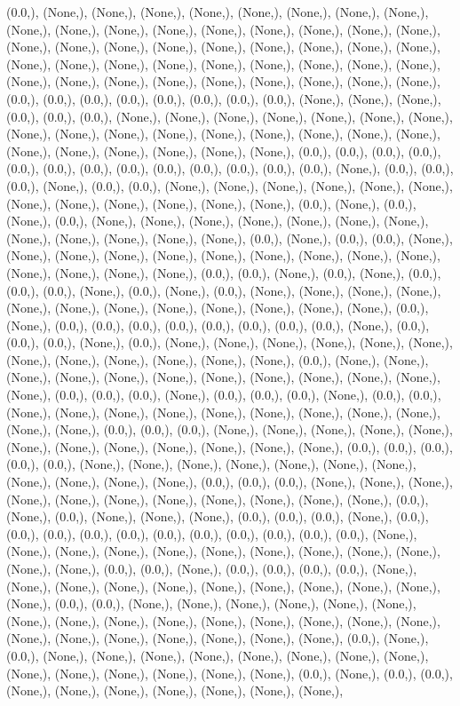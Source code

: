 \documentclass{article}
\begin{document}
(0.0,), (None,), (None,), (None,), (None,), (None,), (None,), (None,), (None,), (None,), (None,), (None,), (None,), (None,), (None,), (None,), (None,), (None,), (None,), (None,), (None,), (None,), (None,), (None,), (None,), (None,), (None,), (None,), (None,), (None,), (None,), (None,), (None,), (None,), (None,), (None,), (None,), (None,), (None,), (None,), (None,), (None,), (None,), (None,), (None,), (0.0,), (0.0,), (0.0,), (0.0,), (0.0,), (0.0,), (0.0,), (0.0,), (None,), (None,), (None,), (0.0,), (0.0,), (0.0,), (None,), (None,), (None,), (None,), (None,), (None,), (None,), (None,), (None,), (None,), (None,), (None,), (None,), (None,), (None,), (None,), (None,), (None,), (None,), (None,), (None,), (None,), (0.0,), (0.0,), (0.0,), (0.0,), (0.0,), (0.0,), (0.0,), (0.0,), (0.0,), (0.0,), (0.0,), (0.0,), (0.0,), (None,), (0.0,), (0.0,), (0.0,), (None,), (0.0,), (0.0,), (None,), (None,), (None,), (None,), (None,), (None,), (None,), (None,), (None,), (None,), (None,), (None,), (0.0,), (None,), (0.0,), (None,), (0.0,), (None,), (None,), (None,), (None,), (None,), (None,), (None,), (None,), (None,), (None,), (None,), (None,), (0.0,), (None,), (0.0,), (0.0,), (None,), (None,), (None,), (None,), (None,), (None,), (None,), (None,), (None,), (None,), (None,), (None,), (None,), (None,), (0.0,), (0.0,), (None,), (0.0,), (None,), (0.0,), (0.0,), (0.0,), (None,), (0.0,), (None,), (0.0,), (None,), (None,), (None,), (None,), (None,), (None,), (None,), (None,), (None,), (None,), (None,), (None,), (0.0,), (None,), (0.0,), (0.0,), (0.0,), (0.0,), (0.0,), (0.0,), (0.0,), (0.0,), (None,), (0.0,), (0.0,), (0.0,), (None,), (0.0,), (None,), (None,), (None,), (None,), (None,), (None,), (None,), (None,), (None,), (None,), (None,), (None,), (0.0,), (None,), (None,), (None,), (None,), (None,), (None,), (None,), (None,), (None,), (None,), (None,), (None,), (0.0,), (0.0,), (0.0,), (None,), (0.0,), (0.0,), (0.0,), (None,), (0.0,), (0.0,), (None,), (None,), (None,), (None,), (None,), (None,), (None,), (None,), (None,), (None,), (None,), (0.0,), (0.0,), (0.0,), (None,), (None,), (None,), (None,), (None,), (None,), (None,), (None,), (None,), (None,), (None,), (None,), (0.0,), (0.0,), (0.0,), (0.0,), (0.0,), (None,), (None,), (None,), (None,), (None,), (None,), (None,), (None,), (None,), (None,), (None,), (0.0,), (0.0,), (0.0,), (None,), (None,), (None,), (None,), (None,), (None,), (None,), (None,), (None,), (None,), (None,), (0.0,), (None,), (0.0,), (None,), (None,), (None,), (0.0,), (0.0,), (0.0,), (None,), (0.0,), (0.0,), (0.0,), (0.0,), (0.0,), (0.0,), (0.0,), (0.0,), (0.0,), (0.0,), (0.0,), (None,), (None,), (None,), (None,), (None,), (None,), (None,), (None,), (None,), (None,), (None,), (None,), (0.0,), (0.0,), (None,), (0.0,), (0.0,), (0.0,), (0.0,), (None,), (None,), (None,), (None,), (None,), (None,), (None,), (None,), (None,), (None,), (None,), (0.0,), (0.0,), (None,), (None,), (None,), (None,), (None,), (None,), (None,), (None,), (None,), (None,), (None,), (None,), (None,), (None,), (None,), (None,), (None,), (None,), (None,), (None,), (None,), (None,), (0.0,), (None,), (0.0,), (None,), (None,), (None,), (None,), (None,), (None,), (None,), (None,), (None,), (None,), (None,), (None,), (None,), (None,), (0.0,), (None,), (0.0,), (0.0,), (None,), (None,), (None,), (None,), (None,), (None,), (None,), 
\end{document}
